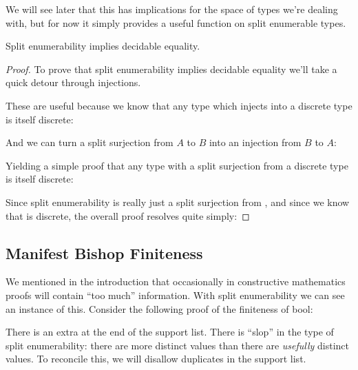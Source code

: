 We will see later that this has implications for the space of types we're
dealing with, but for now it simply provides a useful function on split
enumerable types.
\begin{lemma}\label{split-enum-discrete}
  Split enumerability implies decidable equality.
\end{lemma}
\begin{proof}
To prove that split enumerability implies decidable equality we'll take a quick
detour through injections.

  \begin{multicols}{2}
     \columnbreak
  \end{multicols}

These are useful because we know that any type which injects into a discrete
type is itself discrete:


And we can turn a split surjection from \(A\) to \(B\) into an injection from
\(B\) to \(A\):


Yielding a simple proof that any type with a split surjection from a discrete
type is itself discrete:


Since split enumerability is really just a split surjection from
, and since we know that  is discrete, the
overall proof resolves quite simply:


\end{proof}

\subsection{Manifest Bishop Finiteness}\label{manifest-bishop-finiteness}
We mentioned in the introduction that occasionally in constructive mathematics
proofs will contain ``too much'' information.
With split enumerability we can see an instance of this.
Consider the following proof of the finiteness of bool:
\begin{agdalisting}\label{op-slop}
\end{agdalisting}
There is an extra  at the end of the support
list.
There is ``slop'' in the type of split enumerability: there are more distinct
values than there are \emph{usefully} distinct values.
To reconcile this, we will disallow duplicates in the support list.

